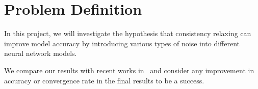 \section{Problem Definition}
\label{sec:problem}


In this project, we will investigate the hypothesis that consistency
relaxing can improve model accuracy by introducing various types of noise
into different neural network models.

We compare our results with recent works in~\cite{chilimbi14adam,
wan2013dropconnect, goodfellow13maxout, dean2012large} and consider any
improvement in accuracy or convergence rate in the final results to be a
success.


